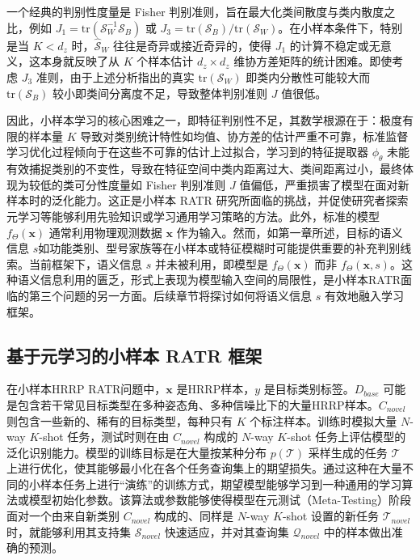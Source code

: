 一个经典的判别性度量是 Fisher 判别准则，旨在最大化类间散度与类内散度之比，例如 $J_1 = \text{tr}(\mathcal{S}_W^{-1} \mathcal{S}_B)$ 或 $J_3 = \text{tr}(\mathcal{S}_B) / \text{tr}(\mathcal{S}_W)$。在小样本条件下，特别是当 $K < d_z$ 时，$\hat{\mathcal{S}}_W$ 往往是奇异或接近奇异的，使得 $J_1$ 的计算不稳定或无意义，这本身就反映了从 $K$ 个样本估计 $d_z \times d_z$ 维协方差矩阵的统计困难。即使考虑 $J_3$ 准则，由于上述分析指出的真实 $\text{tr}(\mathcal{S}_W)$ 即类内分散性可能较大而 $\text{tr}(\mathcal{S}_B)$ 较小即类间分离度不足，导致整体判别准则 $J$ 值很低。

因此，小样本学习的核心困难之一，即特征判别性不足，其数学根源在于：极度有限的样本量 $K$ 导致对类别统计特性如均值、协方差的估计严重不可靠，标准监督学习优化过程倾向于在这些不可靠的估计上过拟合，学习到的特征提取器 $\phi_\theta$ 未能有效捕捉类别的不变性，导致在特征空间中类内距离过大、类间距离过小，最终体现为较低的类可分性度量如 Fisher 判别准则 $J$ 值偏低，严重损害了模型在面对新样本时的泛化能力。这正是小样本 RATR 研究所面临的挑战，并促使研究者探索元学习等能够利用先验知识或学习通用学习策略的方法。此外，标准的模型 $f_\Theta(\mathbf{x})$ 通常利用物理观测数据 $\mathbf{x}$ 作为输入。然而，如第一章所述，目标的语义信息 $s$如功能类别、型号家族等在小样本或特征模糊时可能提供重要的补充判别线索。当前框架下，语义信息 $s$ 并未被利用，即模型是 $f_\Theta(\mathbf{x})$ 而非 $f_\Theta(\mathbf{x}, s)$。这种语义信息利用的匮乏，形式上表现为模型输入空间的局限性，是小样本RATR面临的第三个问题的另一方面。后续章节将探讨如何将语义信息 $s$ 有效地融入学习框架。

\subsection{基于元学习的小样本 RATR 框架}
\label{subsec:meta_learning_framework}
在小样本HRRP RATR问题中，$\mathbf{x}$ 是HRRP样本，$y$ 是目标类别标签。$D_{base}$ 可能是包含若干常见目标类型在多种姿态角、多种信噪比下的大量HRRP样本。$C_{novel}$ 则包含一些新的、稀有的目标类型，每种只有 $K$ 个标注样本。训练时模拟大量 $N$-way $K$-shot 任务，测试时则在由 $C_{novel}$ 构成的 $N$-way $K$-shot 任务上评估模型的泛化识别能力。模型的训练目标是在大量按某种分布 $p(\mathcal{T})$ 采样生成的任务 $\mathcal{T}$ 上进行优化，使其能够最小化在各个任务查询集上的期望损失。通过这种在大量不同的小样本任务上进行“演练”的训练方式，期望模型能够学习到一种通用的学习算法或模型初始化参数。该算法或参数能够使得模型在元测试（Meta-Testing）阶段面对一个由来自新类别 $C_{novel}$ 构成的、同样是 $N$-way $K$-shot 设置的新任务 $\mathcal{T}_{novel}$ 时，就能够利用其支持集 $\mathcal{S}_{novel}$ 快速适应，并对其查询集 $\mathcal{Q}_{novel}$ 中的样本做出准确的预测。

